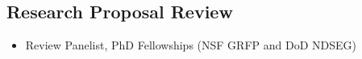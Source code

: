 \documentclass[11pt]{article}
\begin{document}
\subsection{Research Proposal Review}
\begin{itemize}
  \item Review Panelist, PhD Fellowships (NSF GRFP and DoD NDSEG)
\end{itemize}


\end{document}
